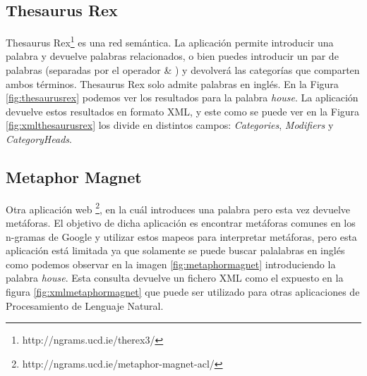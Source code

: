 \subsection{Thesaurus Rex}
\label{cap:subsec:thesaurusrex}

Thesaurus Rex\footnote{http://ngrams.ucd.ie/therex3/} es una red semántica. La aplicación permite introducir una palabra y devuelve palabras relacionados, o bien puedes introducir un par de palabras (separadas por el operador  \& ) y devolverá las categorías que comparten ambos términos.
Thesaurus Rex solo admite palabras en inglés. En la Figura \ref{fig:thesaurusrex} podemos ver los resultados para la palabra  \textit{house}.
La aplicación devuelve estos resultados en formato XML, y este como se puede ver en la Figura \ref{fig:xmlthesaurusrex} los divide en distintos campos: \textit{Categories}, \textit{Modifiers} y \textit{CategoryHeads}.



\subsection{Metaphor Magnet}
\label{cap:subsec:metaphormagnet}
Otra aplicación web \footnote{http://ngrams.ucd.ie/metaphor-magnet-acl/}, en la cuál introduces una palabra pero esta vez devuelve metáforas. El objetivo \citep{VealeT2012} de dicha aplicación es encontrar metáforas comunes en los n-gramas de Google y utilizar estos mapeos para interpretar metáforas, pero esta aplicación está limitada ya que solamente se puede buscar palalabras en inglés como podemos observar en la imagen \ref{fig:metaphormagnet} introduciendo la palabra  \textit{house}.
Esta consulta devuelve un fichero XML como el expuesto en la figura \ref{fig:xmlmetaphormagnet} que puede ser utilizado para otras aplicaciones de Procesamiento de Lenguaje Natural.



